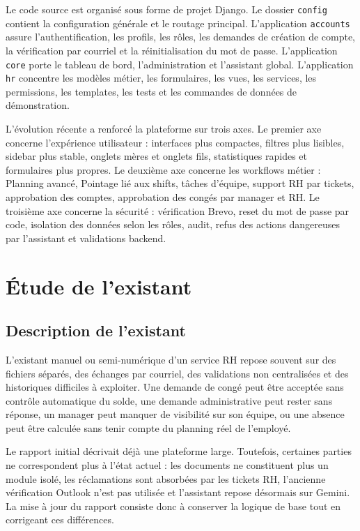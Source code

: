 \documentclass[12pt,a4paper]{report}
\begin{document}
Le code source est organisé sous forme de projet Django. Le dossier \texttt{config} contient la configuration générale et le routage principal. L'application \texttt{accounts} assure l'authentification, les profils, les rôles, les demandes de création de compte, la vérification par courriel et la réinitialisation du mot de passe. L'application \texttt{core} porte le tableau de bord, l'administration et l'assistant global. L'application \texttt{hr} concentre les modèles métier, les formulaires, les vues, les services, les permissions, les templates, les tests et les commandes de données de démonstration.

L'évolution récente a renforcé la plateforme sur trois axes. Le premier axe concerne l'expérience utilisateur : interfaces plus compactes, filtres plus lisibles, sidebar plus stable, onglets mères et onglets fils, statistiques rapides et formulaires plus propres. Le deuxième axe concerne les workflows métier : Planning avancé, Pointage lié aux shifts, tâches d'équipe, support RH par tickets, approbation des comptes, approbation des congés par manager et RH. Le troisième axe concerne la sécurité : vérification Brevo, reset du mot de passe par code, isolation des données selon les rôles, audit, refus des actions dangereuses par l'assistant et validations backend.

\section{Étude de l'existant}
\subsection{Description de l'existant}
L'existant manuel ou semi-numérique d'un service RH repose souvent sur des fichiers séparés, des échanges par courriel, des validations non centralisées et des historiques difficiles à exploiter. Une demande de congé peut être acceptée sans contrôle automatique du solde, une demande administrative peut rester sans réponse, un manager peut manquer de visibilité sur son équipe, ou une absence peut être calculée sans tenir compte du planning réel de l'employé.

Le rapport initial décrivait déjà une plateforme large. Toutefois, certaines parties ne correspondent plus à l'état actuel : les documents ne constituent plus un module isolé, les réclamations sont absorbées par les tickets RH, l'ancienne vérification Outlook n'est pas utilisée et l'assistant repose désormais sur Gemini. La mise à jour du rapport consiste donc à conserver la logique de base tout en corrigeant ces différences.
\end{document}
